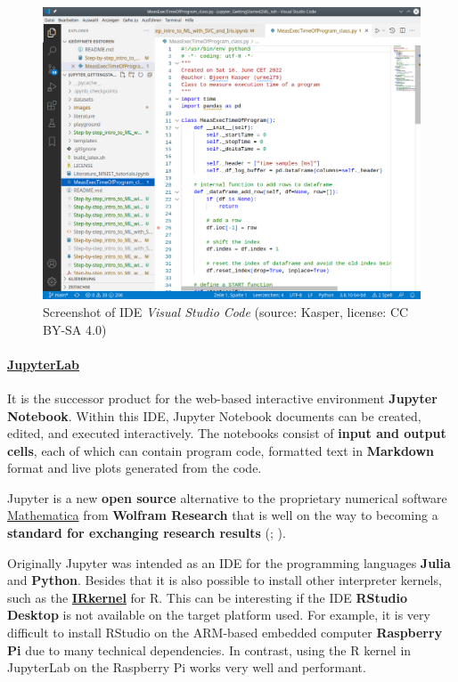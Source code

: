 \documentclass [oneside,10pt,a4paper,ngerman,BCOR10mm,headsepline,parindent,final]{scrartcl}
\begin{document}
\begin{figure}
\centering
\includegraphics{images/Screenshot_VSC.png}
\caption{Screenshot of IDE \emph{Visual Studio Code} (source: Kasper,
license: CC BY-SA 4.0)}
\end{figure}

    \hypertarget{jupyterlab}{%
\paragraph{\texorpdfstring{\href{https://en.wikipedia.org/wiki/Project_Jupyter\#Jupyter_Notebook}{JupyterLab}}{JupyterLab}}\label{jupyterlab}}

It is the successor product for the web-based interactive environment
\textbf{Jupyter Notebook}. Within this IDE, Jupyter Notebook documents
can be created, edited, and executed interactively. The notebooks
consist of \textbf{input and output cells}, each of which can contain
program code, formatted text in \textbf{Markdown} format and live plots
generated from the code.

Jupyter is a new \textbf{open source} alternative to the proprietary
numerical software
\href{https://en.wikipedia.org/wiki/Wolfram_Mathematica}{Mathematica}
from \textbf{Wolfram Research} that is well on the way to becoming a
\textbf{standard for exchanging research results}
(\cite{Scientific_Paper_obsolete_2018};
\cite{Future_of_Research_Paper_2018}).

Originally Jupyter was intended as an IDE for the programming languages
\textbf{Julia} and \textbf{Python}. Besides that it is also possible to
install other interpreter kernels, such as the
\textbf{\href{https://irkernel.github.io/installation/}{IRkernel}} for
R. This can be interesting if the IDE \textbf{RStudio Desktop} is not
available on the target platform used. For example, it is very difficult
to install RStudio on the ARM-based embedded computer \textbf{Raspberry
Pi} due to many technical dependencies. In contrast, using the R kernel
in JupyterLab on the Raspberry Pi works very well and performant.
\end{document}
